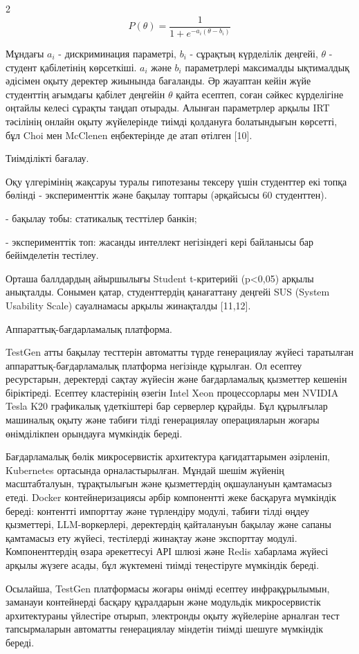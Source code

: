 \begin{multicols}{2}
\begin{equation}
P(\theta) = \frac{1}{1 + e^{-a_{i}(\theta - b_{i})}}
\end{equation}

Мұндағы \(a_i\) - дискриминация параметрі, \(b_i\) - сұрақтың
күрделілік деңгейі,
\(\theta\) - студент қабілетінің көрсеткіші. \(a_i\) және \(b_i\)
параметрлері максималды ықтималдық әдісімен оқыту деректер жиынында
бағаланды. Әр жауаптан кейін жүйе студенттің ағымдағы қабілет деңгейін
\(\theta\)
қайта есептеп, соған сәйкес күрделігіне оңтайлы келесі сұрақты таңдап
отырады. Алынған параметрлер арқылы IRT тәсілінің онлайн оқыту
жүйелерінде тиімді қолдануға болатындығын көрсетті, бұл Choi мен
McClenen еңбектерінде де атап өтілген {[}10{]}.

Тиімділікті бағалау.

Оқу үлгерімінің жақсаруы туралы гипотезаны тексеру үшін студенттер екі
топқа бөлінді - эксперименттік және бақылау топтары (әрқайсысы 60
студенттен).

- бақылау тобы: статикалық тесттілер банкін;

- эксперименттік топ: жасанды интеллект негізіндегі кері байланысы бар
бейімделетін тестілеу.

Орташа баллдардың айыршылығы Student t-критерийі (p<0,05) арқылы
анықталды. Сонымен қатар, студенттердің қанағаттану деңгейі SUS (System
Usability Scale) сауалнамасы арқылы жинақталды {[}11,12{]}.

Аппараттық-бағдарламалық платформа.

TestGen атты бақылау тесттерін автоматты түрде генерациялау жүйесі
таратылған аппараттық-бағдарламалық платформа негізінде құрылған. Ол
есептеу ресурстарын, деректерді сақтау жүйесін және бағдарламалық
қызметтер кешенін біріктіреді. Есептеу кластерінің өзегін Intel Xeon
процессорлары мен NVIDIA Tesla K20 графикалық үдеткіштері бар серверлер
құрайды. Бұл құрылғылар машиналық оқыту және табиғи тілді генерациялау
операцияларын жоғары өнімділікпен орындауға мүмкіндік береді.

Бағдарламалық бөлік микросервистік архитектура қағидаттарымен әзірленіп,
Kubernetes ортасында орналастырылған. Мұндай шешім жүйенің
масштабталуын, тұрақтылығын және қызметтердің оқшаулануын қамтамасыз
етеді. Docker контейнеризациясы әрбір компонентті жеке басқаруға
мүмкіндік береді: контентті импорттау және түрлендіру модулі, табиғи
тілді өңдеу қызметтері, LLM-воркерлері, деректердің қайталануын бақылау
және сапаны қамтамасыз ету жүйесі, тестілерді жинақтау және экспорттау
модулі. Компоненттердің өзара әрекеттесуі АРІ шлюзі және Redis хабарлама
жүйесі арқылы жүзеге асады, бұл жүктемені тиімді теңестіруге мүмкіндік
береді.

Осылайша, TestGen платформасы жоғары өнімді есептеу инфрақұрылымын,
заманауи контейнерді басқару құралдарын және модульдік микросервистік
архитектураны үйлестіре отырып, электронды оқыту жүйелеріне арналған
тест тапсырмаларын автоматты генерациялау міндетін тиімді шешуге
мүмкіндік береді.
\end{multicols}

